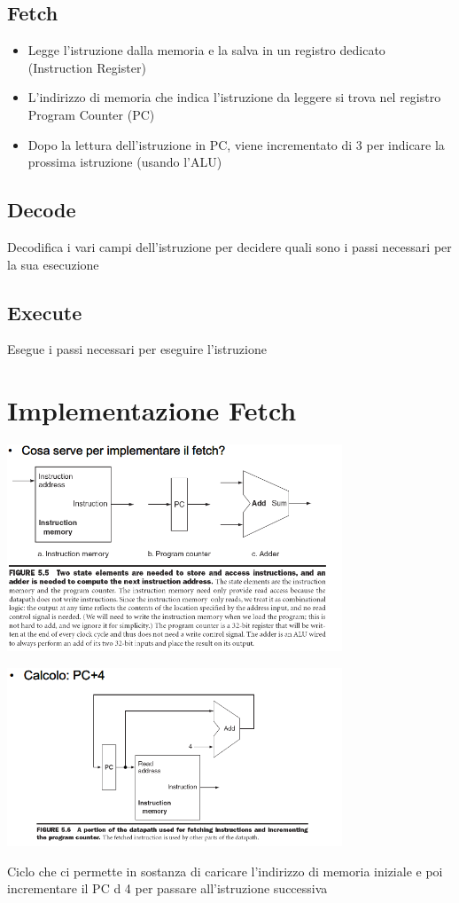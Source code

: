 \documentclass[12pt, a4paper, openany]{book}
\begin{document}
\subsection*{Fetch} \begin{itemize}
    \item Legge l'istruzione dalla memoria e la salva in un registro dedicato
    (Instruction Register)
    \item L'indirizzo di memoria che indica l'istruzione da leggere si trova nel registro
    Program Counter (PC)
    \item Dopo la lettura dell'istruzione in PC, viene incrementato di 3 per indicare la
    prossima istruzione (usando l'ALU)
\end{itemize}
\subsection*{Decode}
Decodifica i vari campi dell'istruzione per decidere quali sono i passi necessari
per la sua esecuzione

\subsection*{Execute}
Esegue i passi necessari per eseguire l'istruzione

\section{Implementazione Fetch}
\begin{center}
    \includegraphics[width=100mm, scale=0.5]{Implementazione fetch.png}
\end{center}
\begin{center}
    \includegraphics[width=100mm, scale=0.5]{Fetch PC+4.png}
\end{center}
Ciclo che ci permette in sostanza di caricare l'indirizzo di memoria iniziale e
poi incrementare il PC d 4 per passare all'istruzione successiva
\end{document}
